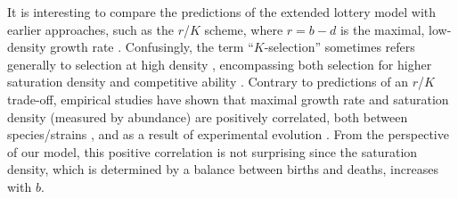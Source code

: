 \documentclass[11pt]{article}
\begin{document}
It is interesting to compare the predictions of the extended lottery model with earlier approaches, such as the $r$/$K$ scheme, where $r=b-d$ is the maximal, low-density growth rate \citep{pianka_1972}. Confusingly, the term ``$K$-selection'' sometimes refers generally to selection at high density \citep{pianka_1972}, encompassing both selection for higher saturation density \citep{macarthur_1967} and competitive ability \citep{gill_1974}. Contrary to predictions of an $r$/$K$ trade-off, empirical studies have shown that maximal growth rate and saturation density (measured by abundance) are positively correlated, both between species/strains \citep{luckinbill_1979,kuno_1991,hendriks_2005,fitzsimmons_2010}, and as a result of experimental evolution \citep{luckinbill_1978,luckinbill_1979}. From the perspective of our model, this positive correlation is not surprising since the saturation density, which is determined by a balance between births and deaths, increases with $b$. 

\end{document}

